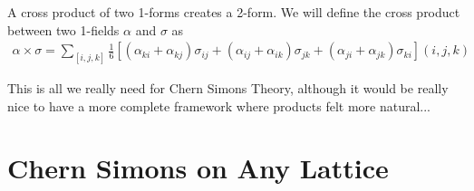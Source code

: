\documentclass[11pt, oneside]{article} %
\numberwithin{equation}{section}
\begin{document}
A cross product of two 1-forms creates a 2-form. We will define the cross product between two 1-fields $\alpha$ and $\sigma$ as 
\begin{align}
    \alpha \times \sigma = 
    \sum_{[i,j,k]} \frac 16 \left [ 
    (\alpha_{ki} +\alpha_{kj} )\sigma_{ij}
    + (\alpha_{ij} +\alpha_{ik} )\sigma_{jk}
    + (\alpha_{ji} +\alpha_{jk} )\sigma_{ki}
    \right ](i,j,k)
\end{align}
\begin{shaded}
    This is all we really need for Chern Simons Theory, although it would be really nice to have a more complete framework where products felt more natural...
\end{shaded}

\section{Chern Simons on Any Lattice}
\end{document}
